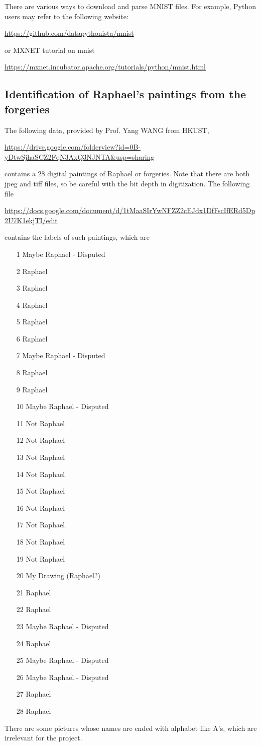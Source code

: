 \documentclass[11pt]{article}
\begin{document}
There are various ways to download and parse MNIST files. For example, Python users may refer to the following website:

\url{https://github.com/datapythonista/mnist}

or MXNET tutorial on mnist

\url{https://mxnet.incubator.apache.org/tutorials/python/mnist.html}


\subsection{Identification of Raphael's paintings from the forgeries}

The following data, provided by Prof. Yang WANG from HKUST,

\url{https://drive.google.com/folderview?id=0B-yDtwSjhaSCZ2FqN3AxQ3NJNTA&usp=sharing}

\noindent contains a 28 digital paintings of Raphael or forgeries. Note that there are both jpeg and tiff files, so be careful with the bit depth in digitization. The following file

\url{https://docs.google.com/document/d/1tMaaSIrYwNFZZ2cEJdx1DfFscIfERd5Dp2U7K1ekjTI/edit}

\noindent contains the labels of such paintings, which are 
\begin{enumerate}
\item[1] Maybe Raphael - Disputed
\item[2] Raphael
\item[3] Raphael
\item[4] Raphael
\item[5] Raphael
\item[6] Raphael
\item[7] Maybe Raphael - Disputed
\item[8] Raphael
\item[9] Raphael
\item[10] Maybe Raphael - Disputed
\item[11] Not Raphael
\item[12] Not Raphael
\item[13] Not Raphael
\item[14] Not Raphael
\item[15] Not Raphael
\item[16] Not Raphael
\item[17] Not Raphael
\item[18] Not Raphael
\item[19] Not Raphael
\item[20] My Drawing (Raphael?)
\item[21] Raphael
\item[22] Raphael
\item[23] Maybe Raphael - Disputed
\item[24] Raphael
\item[25] Maybe Raphael - Disputed
\item[26] Maybe Raphael - Disputed
\item[27] Raphael
\item[28] Raphael
\end{enumerate}
There are some pictures whose names are ended with alphabet like A's, which are irrelevant for the project. 
\end{document}

